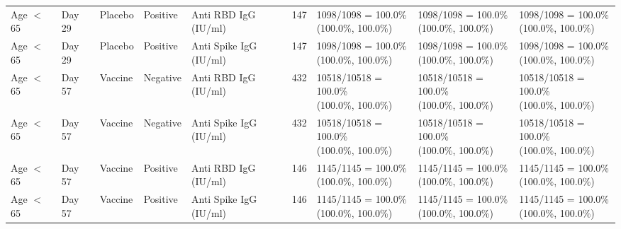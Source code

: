 \documentclass[]{book}
\theoremstyle{definition}
\theoremstyle{definition}
\theoremstyle{definition}
\newcommand{\1}{\mathbbm{1}}
\begin{document}
\begin{landscape}
\begin{ThreePartTable}
\begin{longtable}[t]{>{\raggedright\arraybackslash}p{2.7cm}llllllll}
\hspace{1em}Age $<$ 65 & Day 29 & Placebo & Positive & Anti RBD IgG (IU/ml) & 147 & \makecell[l]{1098/1098 = 100.0\%\\(100.0\%, 100.0\%)} & \makecell[l]{1098/1098 = 100.0\%\\(100.0\%, 100.0\%)} & \makecell[l]{1098/1098 = 100.0\%\\(100.0\%, 100.0\%)}\\
\hspace{1em}Age $<$ 65 & Day 29 & Placebo & Positive & Anti Spike IgG (IU/ml) & 147 & \makecell[l]{1098/1098 = 100.0\%\\(100.0\%, 100.0\%)} & \makecell[l]{1098/1098 = 100.0\%\\(100.0\%, 100.0\%)} & \makecell[l]{1098/1098 = 100.0\%\\(100.0\%, 100.0\%)}\\
\hspace{1em}Age $<$ 65 & Day 57 & Vaccine & Negative & Anti RBD IgG (IU/ml) & 432 & \makecell[l]{10518/10518 = 100.0\%\\(100.0\%, 100.0\%)} & \makecell[l]{10518/10518 = 100.0\%\\(100.0\%, 100.0\%)} & \makecell[l]{10518/10518 = 100.0\%\\(100.0\%, 100.0\%)}\\
\hspace{1em}Age $<$ 65 & Day 57 & Vaccine & Negative & Anti Spike IgG (IU/ml) & 432 & \makecell[l]{10518/10518 = 100.0\%\\(100.0\%, 100.0\%)} & \makecell[l]{10518/10518 = 100.0\%\\(100.0\%, 100.0\%)} & \makecell[l]{10518/10518 = 100.0\%\\(100.0\%, 100.0\%)}\\
\hspace{1em}Age $<$ 65 & Day 57 & Vaccine & Positive & Anti RBD IgG (IU/ml) & 146 & \makecell[l]{1145/1145 = 100.0\%\\(100.0\%, 100.0\%)} & \makecell[l]{1145/1145 = 100.0\%\\(100.0\%, 100.0\%)} & \makecell[l]{1145/1145 = 100.0\%\\(100.0\%, 100.0\%)}\\
\hspace{1em}Age $<$ 65 & Day 57 & Vaccine & Positive & Anti Spike IgG (IU/ml) & 146 & \makecell[l]{1145/1145 = 100.0\%\\(100.0\%, 100.0\%)} & \makecell[l]{1145/1145 = 100.0\%\\(100.0\%, 100.0\%)} & \makecell[l]{1145/1145 = 100.0\%\\(100.0\%, 100.0\%)}\\

\end{longtable}
\end{ThreePartTable}
\end{landscape}
\end{document}
